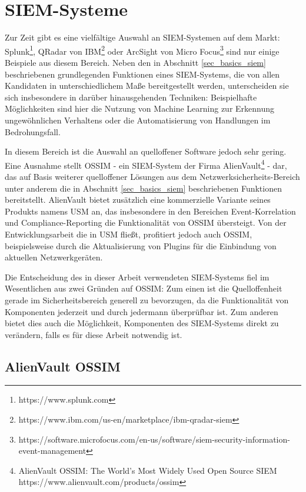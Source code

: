 \section{SIEM-Systeme}

\label{sec_state_siem}

Zur Zeit gibt es eine vielfältige Auswahl an SIEM-Systemen auf dem Markt: Splunk\footnote{
  https://www.splunk.com
}, QRadar von IBM\footnote{
  https://www.ibm.com/us-en/marketplace/ibm-qradar-siem
} oder ArcSight von Micro Focus\footnote{
  https://software.microfocus.com/en-us/software/siem-security-information-event-management
} sind nur einige Beispiele aus diesem Bereich. Neben den in Abschnitt \ref{sec_basics_siem} beschriebenen grundlegenden Funktionen eines SIEM-Systems, die von allen Kandidaten in unterschiedlichem Maße bereitgestellt werden, unterscheiden sie sich insbesondere in darüber hinausgehenden Techniken: Beispielhafte Möglichkeiten sind hier die Nutzung von Machine Learning zur Erkennung ungewöhnlichen Verhaltens oder die Automatisierung von Handlungen im Bedrohungsfall.

In diesem Bereich ist die Auswahl an quelloffener Software jedoch sehr gering. Eine Ausnahme stellt OSSIM - ein SIEM-System der Firma AlienVault\footnote{
	AlienVault OSSIM: The World’s Most Widely Used Open Source SIEM\\https://www.alienvault.com/products/ossim
} - dar, das auf Basis weiterer quelloffener Lösungen aus dem Netzwerksicherheits-Bereich unter anderem die in Abschnitt \ref{sec_basics_siem} beschriebenen Funktionen bereitstellt. AlienVault bietet zusätzlich eine kommerzielle Variante seines Produkts namens USM an, das insbesondere in den Bereichen Event-Korrelation und Compliance-Reporting die Funktionalität von OSSIM übersteigt. Von der Entwicklungsarbeit die in USM fließt, profitiert jedoch auch OSSIM, beispielsweise durch die Aktualisierung von Plugins für die Einbindung von aktuellen Netzwerkgeräten.

Die Entscheidung des in dieser Arbeit verwendeten SIEM-Systems fiel im Wesentlichen aus zwei Gründen auf OSSIM:
Zum einen ist die Quelloffenheit gerade im Sicherheitsbereich generell zu bevorzugen, da die Funktionalität von Komponenten jederzeit und durch jedermann überprüfbar ist. Zum anderen bietet dies auch die Möglichkeit, Komponenten des SIEM-Systems direkt zu verändern, falls es für diese Arbeit notwendig ist.

\subsection{AlienVault OSSIM}

